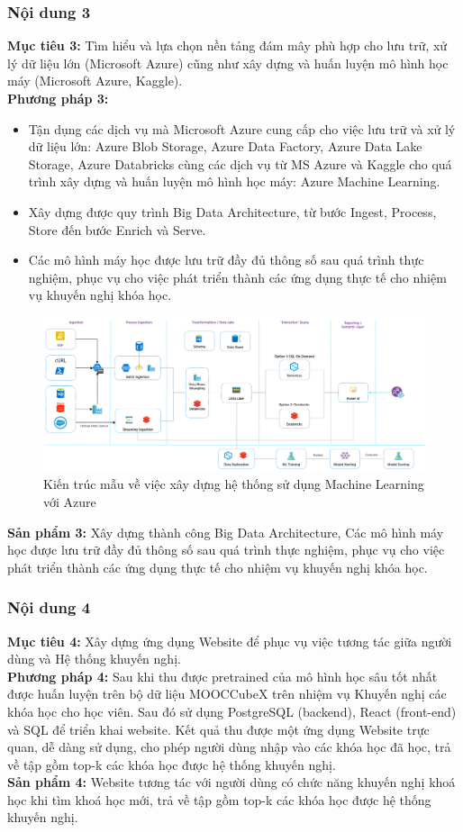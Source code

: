 \subsubsection{Nội dung 3}
\textbf{Mục tiêu 3:} Tìm hiểu và lựa chọn nền tảng đám mây phù hợp cho lưu trữ, xử lý dữ liệu lớn (Microsoft Azure) cũng như xây dựng và huấn luyện mô hình học máy (Microsoft Azure, Kaggle).\\
\textbf{Phương pháp 3:}
\begin{itemize}
    \item Tận dụng các dịch vụ mà Microsoft Azure cung cấp cho việc lưu trữ và xử lý dữ liệu lớn: Azure Blob Storage, Azure Data Factory, Azure Data Lake Storage, Azure Databricks cùng các dịch vụ từ MS Azure và Kaggle cho quá trình xây dựng và huấn luyện mô hình học máy: Azure Machine Learning.
    \item Xây dựng được quy trình Big Data Architecture, từ bước Ingest, Process, Store đến bước Enrich và Serve.
    \item Các mô hình máy học được lưu trữ đầy đủ thông số sau quá trình thực nghiệm, phục vụ cho việc phát triển thành các ứng dụng thực tế cho nhiệm vụ khuyến nghị khóa học.
\end{itemize}
\begin{figure}[h]
    \centering
    \includegraphics[width=0.75\linewidth]{figures/56.png}
    \caption{Kiến trúc mẫu về việc xây dựng hệ thống sử dụng Machine Learning với Azure}
\end{figure}
\textbf{Sản phẩm 3:} Xây dựng thành công Big Data Architecture, Các mô hình máy học được lưu trữ đầy đủ thông số sau quá trình thực nghiệm, phục vụ cho việc phát triển thành các ứng dụng thực tế cho nhiệm vụ khuyến nghị khóa học.
\subsubsection{Nội dung 4}
\textbf{Mục tiêu 4:} Xây dựng ứng dụng Website để phục vụ việc tương tác giữa người
dùng và Hệ thống khuyến nghị.\\
\textbf{Phương pháp 4:} Sau khi thu được pretrained của mô hình học sâu tốt nhất được huấn luyện trên bộ dữ liệu MOOCCubeX trên nhiệm vụ Khuyến nghị các khóa học cho học viên. Sau đó sử dụng PostgreSQL (backend), React (front-end) và SQL để triển khai website. Kết quả thu được một ứng dụng Website trực quan, dễ dàng sử dụng, cho phép người dùng nhập vào các khóa học đã học, trả về tập gồm top-k các khóa học được hệ thống khuyến nghị.\\
\textbf{Sản phẩm 4:} Website tương tác với người dùng có chức năng khuyến nghị khoá học khi tìm khoá học mới, trả về tập gồm top-k các khóa học được hệ thống khuyến nghị.
